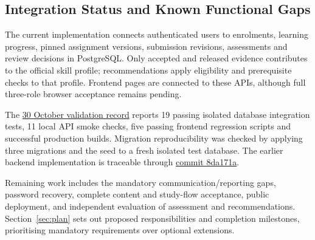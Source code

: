 \subsection{Integration Status and Known Functional Gaps}

The current implementation connects authenticated users to enrolments,
learning progress, pinned assignment versions, submission revisions,
assessments and review decisions in PostgreSQL. Only accepted and released
evidence contributes to the official skill profile; recommendations apply
eligibility and prerequisite checks to that profile. Frontend pages are
connected to these APIs, although full three-role browser acceptance remains
pending.

The
\href{https://github.com/huyho44/IELTS-Evaluator-Pro/blob/dbbe536/docs/validation/MVP-checks-2026-10-30.md}{30 October validation record}
reports 19 passing isolated database integration tests, 11 local API smoke
checks, five passing frontend regression scripts and successful production
builds. Migration reproducibility was checked by applying three migrations
and the seed to a fresh isolated test database. The earlier backend
implementation is traceable through
\href{https://github.com/huyho44/IELTS-Evaluator-Pro/commit/8da171afdce3bfe58bec1d10ded401ce745ad9a3}{commit 8da171a}.

Remaining work includes the mandatory communication/reporting gaps,
password recovery, complete content and study-flow acceptance, public
deployment, and independent evaluation of assessment and recommendations.
Section~\ref{sec:plan} sets out proposed responsibilities and completion
milestones, prioritising mandatory requirements over optional extensions.
